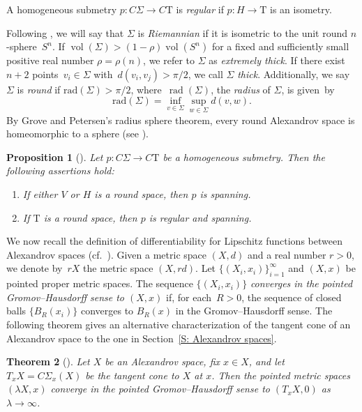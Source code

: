 \documentclass[pdftex]{sigma}
\numberwithin{equation}{section}
\newtheorem{thm}{Theorem}[section]
\newtheorem{prop}[thm]{Proposition}
\theoremstyle{definition}
\DeclareMathOperator{\vol}{vol}
\DeclareMathOperator{\rad}{rad}
\newcommand{\Sp}{S} %
\newcommand{\Tau}{\mathrm{T}}
\begin{document}
A homogeneous submetry $p\colon C\Sigma\to C\Tau$ is \emph{regular} if $p\colon H\to \Tau$ is an isometry.

Following \cite[Definition 2.5]{Lytchak}, we will say that $\Sigma$ is \emph{Riemannian} if it is isometric to the unit round $n$-sphere~$\Sp^n$. If $\vol(\Sigma)>(1-\rho)\vol(\Sp^n)$ for a fixed and sufficiently small positive real number $\rho=\rho(n)$, we refer to $\Sigma$ as \emph{extremely thick}. If there exist $n+2$ points~${v_i\in \Sigma}$ with~${d(v_i,v_j)>\pi/2}$, we call $\Sigma$ \emph{thick}. Additionally, we say $\Sigma$ is \emph{round} if $\mathrm{rad}(\Sigma)>\pi/2$, where~$\rad(\Sigma)$, the \emph{radius} of $\Sigma$, is given~by
\[
 	\mathrm{rad}(\Sigma) = \inf_{v\in \Sigma}\sup_{w\in \Sigma}d(v,w).
\]
By Grove and Petersen's radius sphere theorem, every round Alexandrov space is homeomorphic to a sphere (see \cite{GrovePetersen1993}).

\begin{prop}[]
\label{L: Base space of homogenous submetry is a disk, then p is regular}
Let $p\colon C\Sigma\to C\Tau$ be a homogeneous submetry. Then the following assertions hold:
\begin{enumerate}\itemsep=0pt
\item[$(1)$] If either $V$ or $H$ is a round space, then $p$ is spanning.
\item[$(2)$] If $\Tau$ is a round space, then $p$ is regular and spanning.
\end{enumerate}	
\end{prop}


We now recall the definition of differentiability for Lipschitz functions between Alexandrov spaces (cf.\ \cite[Section 3]{Lytchak}). Given a metric space $(X,d)$ and a real number $r>0$, we denote by~$rX$ the metric space $(X,rd)$.
Let $\{(X_i,x_i)\}_{i=1}^\infty$ and $(X,x)$ be pointed proper metric spaces.
The sequence $\{(X_i,x_i)\}$ \emph{converges in the pointed Gromov--Hausdorff sense to $(X,x)$} if, for each~${R>0}$, the sequence of closed balls $\{B_R(x_i)\}$ converges to $B_R(x)$ in the Gromov--Hausdorff sense. The following theorem gives an alternative characterization of the tangent cone of an Alexandrov space to the one in Section~\ref{S: Alexandrov spaces}.



\begin{thm}[]
Let $X$ be an Alexandrov space, fix $x\in X$, and let $T_xX=C\Sigma_x(X)$ be the tangent cone to $X$ at $x$.
Then the pointed metric spaces $(\lambda X,x)$ converge in the pointed Gromov--Hausdorff sense to $(T_xX, 0)$ as $\lambda\to \infty$.
\end{thm}
\end{document}
